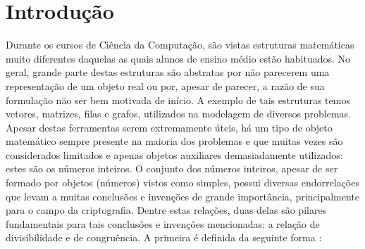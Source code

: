 \chapter{Introdução} 

\label{chap:intro}

Durante os cursos de Ciência da Computação, são vistas estruturas matemáticas muito diferentes daquelas as quais alunos de ensino médio estão habituados. No geral, grande parte destas estruturas são abstratas por não parecerem uma representação de um objeto real ou por, apesar de parecer, a razão de sua formulação não ser bem motivada de início. A exemplo de tais estruturas temos vetores, matrizes, filas e grafos, utilizados na modelagem de diversos problemas. Apesar destas ferramentas serem extremamente úteis, há um tipo de objeto matemático sempre presente na maioria dos problemas e que muitas vezes são considerados limitados e apenas objetos auxiliares demasiadamente utilizados: estes são os números inteiros. O conjunto dos números inteiros, apesar de ser formado por objetos (números) vistos como simples, possui diversas endorrelações que levam a muitas conclusões e invenções de grande importância, principalmente para o campo da criptografia. Dentre estas relações, duas delas são pilares fundamentais para tais conclusões e invenções mencionadas: a relação de divisibilidade e de congruência. A primeira é definida da seguinte forma 
\cite{book:2399854}:

